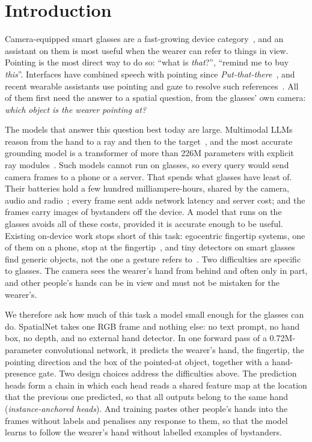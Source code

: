 \section{Introduction}\label{sec:intro}

Camera-equipped smart glasses are a fast-growing device category~\cite{idc2026xr,counterpoint2026aiglasses}, and an assistant on them is most useful when the wearer can refer to things in view. Pointing is the most direct way to do so: ``what is \emph{that}?'', ``remind me to buy \emph{this}''. Interfaces have combined speech with pointing since \emph{Put-that-there}~\cite{bolt1980put}, and recent wearable assistants use pointing and gaze to resolve such references~\cite{lee2024gazepointar}. All of them first need the answer to a spatial question, from the glasses' own camera: \emph{which object is the wearer pointing at?}

The models that answer this question best today are large. Multimodal LLMs reason from the hand to a ray and then to the target~\cite{egopoint,li2026pointvgr}, and the most accurate grounding model is a transformer of more than 226M parameters with explicit ray modules~\cite{li2026vistaref}. Such models cannot run on glasses, so every query would send camera frames to a phone or a server. That spends what glasses have least of. Their batteries hold a few hundred milliampere-hours, shared by the camera, audio and radio~\cite{yuan2026aiglasses}; every frame sent adds network latency and server cost; and the frames carry images of bystanders off the device. A model that runs on the glasses avoids all of these costs, provided it is accurate enough to be useful. Existing on-device work stops short of this task: egocentric fingertip systems, one of them on a phone, stop at the fingertip~\cite{huang2016pointing,jain2019gestarlite}, and tiny detectors on smart glasses find generic objects, not the one a gesture refers to~\cite{moosmann2024tinyissimoyolo}. Two difficulties are specific to glasses. The camera sees the wearer's hand from behind and often only in part, and other people's hands can be in view and must not be mistaken for the wearer's.

We therefore ask how much of this task a model small enough for the glasses can do. SpatialNet takes one RGB frame and nothing else: no text prompt, no hand box, no depth, and no external hand detector. In one forward pass of a 0.72M-parameter convolutional network, it predicts the wearer's hand, the fingertip, the pointing direction and the box of the pointed-at object, together with a hand-presence gate. Two design choices address the difficulties above. The prediction heads form a chain in which each head reads a shared feature map at the location that the previous one predicted, so that all outputs belong to the same hand (\emph{instance-anchored heads}). And training pastes other people's hands into the frames without labels and penalises any response to them, so that the model learns to follow the wearer's hand without labelled examples of bystanders.

